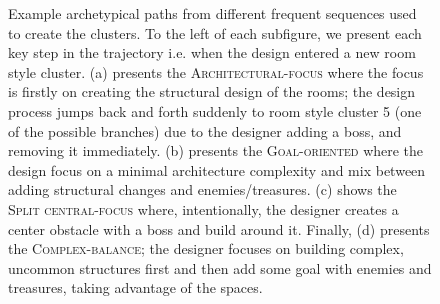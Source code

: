 \begin{figure}[t!]
    \centering
     \hfill
     \hfill
     \hfill
    
    \caption{Example archetypical paths from different frequent sequences used to create the clusters. To the left of each subfigure, we present each key step in the trajectory i.e. when the design entered a new room style cluster. (a) presents the \textsc{Architectural-focus} where the focus is firstly on creating the structural design of the rooms; the design process jumps back and forth suddenly to room style cluster 5 (one of the possible branches) due to the designer adding a boss, and removing it immediately. (b) presents the \textsc{Goal-oriented} where the design focus on a minimal architecture complexity and mix between adding structural changes and enemies/treasures. (c) shows the \textsc{Split central-focus} where, intentionally, the designer creates a center obstacle with a boss and build around it. Finally, (d) presents the \textsc{Complex-balance}; the designer focuses on building complex, uncommon structures first and then add some goal with enemies and treasures, taking advantage of the spaces.}
    \label{fig:archetypical-examples}
\end{figure}

